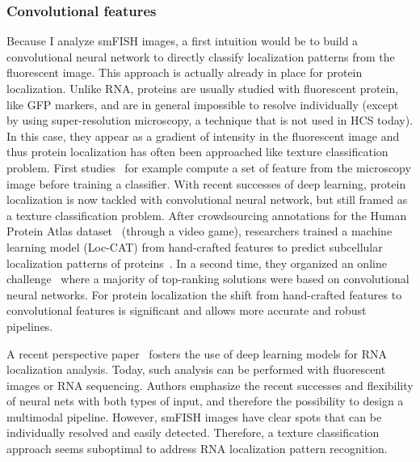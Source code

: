 \subsubsection{Convolutional features}

Because I analyze smFISH images, a first intuition would be to build a convolutional neural network to directly classify localization patterns from the fluorescent image.
This approach is actually already in place for protein localization.
Unlike RNA, proteins are usually studied with fluorescent protein, like \ac{GFP} markers, and are in general impossible to resolve individually (except by using super-resolution microscopy, a technique that is not used in HCS today).
In this case, they appear as a gradient of intensity in the fluorescent image and thus protein localization has often been approached like texture classification problem.
First studies~\cite{boland_automated_1998} for example compute a set of feature from the microscopy image before training a classifier.
With recent successes of deep learning, protein localization is now tackled with convolutional neural network, but still framed as a texture classification problem.
After crowdsourcing annotations for the Human Protein Atlas dataset~\cite{Uhlen_2015} (through a video game), researchers trained a machine learning model (Loc-CAT) from hand-crafted features to predict subcellular localization patterns of proteins~\cite{sullivan_deep_2018}.
In a second time, they organized an online challenge~\cite{ouyang_analysis_2019} where a majority of top-ranking solutions were based on convolutional neural networks.
For protein localization the shift from hand-crafted features to convolutional features is significant and allows more accurate and robust pipelines.

A recent perspective paper~\cite{Savulescu_2021} fosters the use of deep learning models for RNA localization analysis.
Today, such analysis can be performed with fluorescent images or RNA sequencing.
Authors emphasize the recent successes and flexibility of neural nets with both types of input, and therefore the possibility to design a multimodal pipeline.
However, smFISH images have clear spots that can be individually resolved and easily detected.
Therefore, a texture classification approach seems suboptimal to address \ac{RNA} localization pattern recognition.


